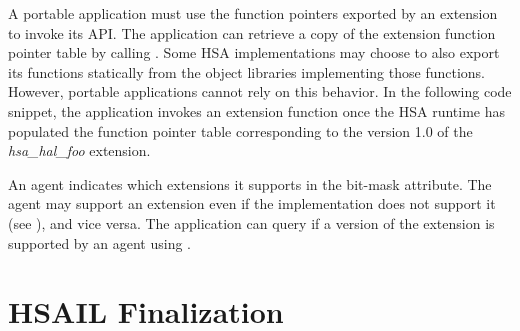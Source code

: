 \documentclass[final,oneside]{book}
\begin{document}
A portable application must use the function pointers exported by an extension
to invoke its API. The application can retrieve a copy of the extension function
pointer table by calling . Some HSA
implementations may choose to also export its functions statically from the
object libraries implementing those functions. However, portable applications
cannot rely on this behavior. In the following code snippet, the application
invokes an extension function once the HSA runtime has populated the function
pointer table corresponding to the version 1.0 of the \textit{hsa_hal_foo}
extension.


An agent indicates which extensions it supports in the
 bit-mask attribute. The agent may support
an extension even if the implementation does not support it (see
), and vice versa. The application can query
if a version of the extension is supported by an agent using
.

\section{HSAIL Finalization}\label{sec:finalizer}
\end{document}
